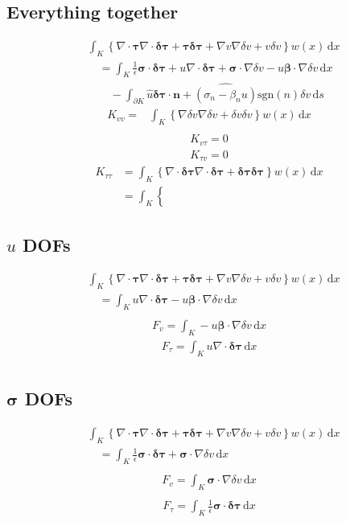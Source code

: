 \documentclass[a4paper]{article}
\def\d{\,\mathrm{d}}
\def\dx{\d x}
\def\ds{\d s}
\def\btau{\boldsymbol\tau}
\def\bsigma{\boldsymbol\sigma}
\def\bbeta{\boldsymbol\beta}
\def\bn{\mathbf{n}}
\def\dtau{\boldsymbol{\delta\tau}}
\def\dv{\delta v}
\def\div{\nabla\cdot}
\begin{document}
\subsection*{Everything together}
\begin{align*}
&\int_K\left\{\div\btau\div\dtau+\btau\dtau
+\nabla v\nabla\dv+v\dv\right\}w(x)\dx\\
&\quad=\int_K\frac{1}{\epsilon}\bsigma\cdot\dtau+u\div\dtau
+\bsigma\cdot\nabla\dv-u\bbeta\cdot\nabla\dv\dx\\
&\quad\quad
-\int_{\partial K}\hat u\dtau\cdot\bn+\widehat{(\sigma_n
-\beta_nu)}\text{sgn}(n)\dv\ds
\end{align*}
\begin{align*}
K_{vv}=
&\int_K\left\{
\nabla\dv\nabla\dv+\dv\dv\right\}w(x)\dx\\
\end{align*}
\begin{align*}
K_{v\tau}=0
\end{align*}
\begin{align*}
K_{\tau v}=0
\end{align*}
\begin{align*}
K_{\tau\tau}&=
\int_K\left\{\div\dtau\div\dtau+\dtau\dtau
\right\}w(x)\dx\\
&=\int_K\left\{
\end{align*}
\subsection*{$u$ DOFs}
\begin{align*}
&\int_K\left\{\div\btau\div\dtau+\btau\dtau
+\nabla v\nabla\dv+v\dv\right\}w(x)\dx\\
&\quad=\int_Ku\div\dtau
-u\bbeta\cdot\nabla\dv\dx\\
\end{align*}
\begin{align*}
F_v=
\int_K-u\bbeta\cdot\nabla\dv\dx
\end{align*}
\begin{align*}
F_\tau=
\int_Ku\div\dtau
\dx\\
\end{align*}
\subsection*{$\bsigma$ DOFs}
\begin{align*}
&\int_K\left\{\div\btau\div\dtau+\btau\dtau
+\nabla v\nabla\dv+v\dv\right\}w(x)\dx\\
&\quad=\int_K\frac{1}{\epsilon}\bsigma\cdot\dtau
+\bsigma\cdot\nabla\dv\dx\\
\end{align*}
\begin{align*}
F_v=
\int_K\bsigma\cdot\nabla\dv\dx\\
\end{align*}
\begin{align*}
F_\tau=
\int_K\frac{1}{\epsilon}\bsigma\cdot\dtau
\dx\\
\end{align*}
\end{document}
